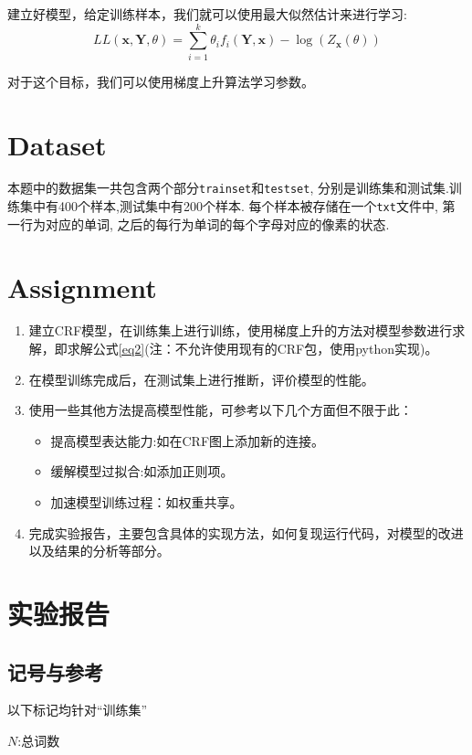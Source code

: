 \documentclass[a4paper,UTF8]{article}
\numberwithin{equation}{section}
\begin{document}
建立好模型，给定训练样本，我们就可以使用最大似然估计来进行学习:
\begin{equation}
    LL(\mathbf{x},\mathbf{Y},\theta) =\sum_{i=1}^{k} \theta_{i} f_{i}(\mathbf{Y}, \mathbf{x}) -\log \left(Z_{\mathbf{x}}(\theta)\right)\label{eq2}
\end{equation}

对于这个目标，我们可以使用梯度上升算法学习参数。

\section{Dataset}
本题中的数据集一共包含两个部分\texttt{trainset}和\texttt{testset}, 分别是训练集和测试集.训练集中有400个样本,测试集中有200个样本. 每个样本被存储在一个\texttt{txt}文件中, 第一行为对应的单词, 之后的每行为单词的每个字母对应的像素的状态.

\section{Assignment}
\begin{enumerate}
    \item 建立CRF模型，在训练集上进行训练，使用梯度上升的方法对模型参数进行求解，即求解公式\eqref{eq2}(注：不允许使用现有的CRF包，使用python实现)。
    \item 在模型训练完成后，在测试集上进行推断，评价模型的性能。
    \item 使用一些其他方法提高模型性能，可参考以下几个方面但不限于此：
    \begin{itemize}
        \item 提高模型表达能力:如在CRF图上添加新的连接。
        \item 缓解模型过拟合:如添加正则项。
        \item 加速模型训练过程：如权重共享。
    \end{itemize}
    \item 完成实验报告，主要包含具体的实现方法，如何复现运行代码，对模型的改进以及结果的分析等部分。
\end{enumerate}
\section {实验报告}
\subsection{记号与参考}
以下标记均针对“训练集”

$N$:总词数
\end{document}
